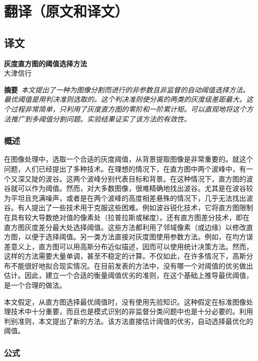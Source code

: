 
\chapter{翻译（原文和译文）}

\section*{译文}

\begin{center}
 \Large \textbf{灰度直方图的阈值选择方法}\\[10pt]
\normalsize 大津信行\\[10pt]
\end{center}

\textbf{摘要}\ \textit{本文提出了一种为图像分割而进行的非参数且非监督的自动阈值选择方法。最优阈值是用判决准则选取的。这个判决准则使分离的两类的灰度级差距最大。这个过程非常简单，只利用了灰度直方图的零阶和一阶累计矩。可以直观地将这个方法推广到多阈值分割问题。实验结果证实了该方法的有效性。}

\subsection*{概述}


在图像处理中，选取一个合适的灰度阈值，从背景提取图像是非常重要的。就这个问题，人们已经提出了多种技术。在理想的情况下，在直方图中两个波峰中，有一个又深又陡的波谷。这两个波峰分别代表目标和背景。在这种情况下，直方图的波谷就可以作为阈值。然而，对大多数图像，很难精确地找出波谷。尤其是在波谷较为平坦且充满噪声，或者是在两个波峰的高度相差悬殊的情况下，几乎无法找出波谷。有人提出了一些技术用于克服这些困难。例如波谷锐化技术，它将直方图限制在具有较大导数绝对值的像素处（拉普拉斯或梯度）。还有直方图差分技术，即在直方图灰度差分最大处选择阈值。这些方法都利用了邻域像素（或边缘）以修改直方图，以便于选择阈值。另一类方法直接对灰度图使用参数方法。例如，在均方误差意义上，直方图可以用高斯分布近似描述，因而可以使用统计决策方法。然而，这样的方法需要大量单调，甚至不稳定的计算。不仅如此，在许多情况下，高斯分布不能很好地拟合现实情况。在目前发表的方法中，没有哪一个对阈值的优劣做出估计。因此，建立一个合适的衡量阈值优劣的准则，在这个基础上推导最优阈值，是一个合理的做法。

本文假定，从直方图选择最优阈值时，没有使用先验知识。这种假定在标准图像处理技术中十分重要，而且也是模式识别的非监督分类问题中也是十分必要的。利用判别准则，本文提出了新的方法。该方法直接估计阈值的优劣，自动选择最优化的阈值。

\subsection*{公式}

